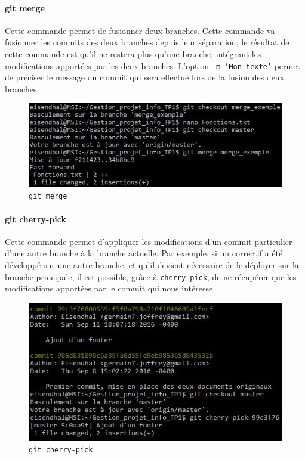 \documentclass[11pt,canadien]{article}
\begin{document}
\paragraph{git merge}Cette commande permet de fusionner deux branches. Cette commande va fusionner les commits des deux branches depuis leur séparation, le résultat de cette commande est qu'il ne restera plus qu'une branche, intégrant les modifications apportées par les deux branches. L'option \texttt{-m 'Mon texte'} permet de préciser le message du commit qui sera effectué lors de la fusion des deux branches.
\begin{figure}
	\centering
	\includegraphics[width=\textwidth]{images/git_merge.jpg}
	\caption{\texttt{git merge}}
	\label{fig:git_merge}
\end{figure}

\paragraph{git cherry-pick}Cette commande permet d'appliquer les modifications d'un commit particulier d'une autre branche à la branche actuelle. Par exemple, si un correctif a été développé sur une autre branche, et qu'il devient nécessaire de le déployer sur la branche principale, il est possible, grâce à \texttt{cherry-pick}, de ne récupérer que les modifications apportées par le commit qui nous intéresse.
\begin{figure}
	\centering
	\includegraphics[width=\textwidth]{images/git_cherry-pick.jpg}
	\caption{\texttt{git cherry-pick}}
	\label{fig:git_cherry-pick}
\end{figure}
\end{document}
